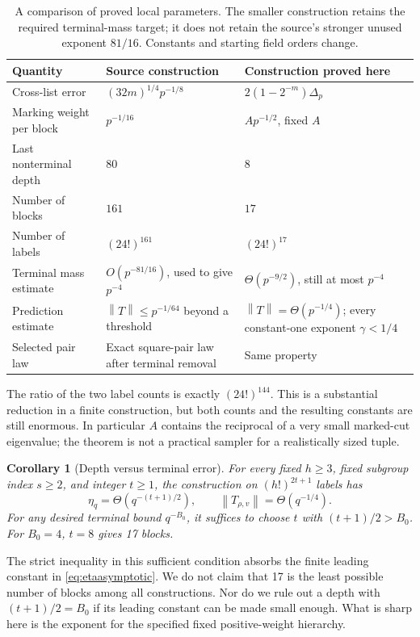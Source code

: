\documentclass[11pt,a4paper]{article}
\numberwithin{equation}{section}
\newtheorem{corollary}[theorem]{Corollary}
\theoremstyle{definition}
\theoremstyle{remark}
\newcommand{\norm}[1]{\left\lVert #1\right\rVert}
\begin{document}
\begin{table}[htbp]
\centering\small
\begin{tabularx}{\textwidth}{@{}lXX@{}}
\toprule
Quantity & Source construction \cite{square} & Construction proved here\\
\midrule
Cross-list error & $(32m)^{1/4}p^{-1/8}$ & $2(1-2^{-m})\Delta_p$\\
Marking weight per block & $p^{-1/16}$ & $A p^{-1/2}$, fixed $A$\\
Last nonterminal depth & $80$ & $8$\\
Number of blocks & $161$ & $17$\\
Number of labels & $(24!)^{161}$ & $(24!)^{17}$\\
Terminal mass estimate & $O(p^{-81/16})$, used to give $p^{-4}$ &
  $\Theta(p^{-9/2})$, still at most $p^{-4}$\\
Prediction estimate & $\norm T\le p^{-1/64}$ beyond a threshold &
  $\norm T=\Theta(p^{-1/4})$; every constant-one exponent $\gamma<1/4$\\
Selected pair law & Exact square-pair law after terminal removal & Same property\\
\bottomrule
\end{tabularx}
\caption{A comparison of proved local parameters. The smaller construction
retains the required terminal-mass target; it does not retain the source's
stronger unused exponent $81/16$. Constants and starting field orders change.}
\label{tab:comparison}
\end{table}

The ratio of the two label counts is exactly $(24!)^{144}$.
This is a substantial reduction in a finite construction, but both
counts and the resulting constants are still enormous. In particular
$A$ contains the reciprocal of a very small marked-cut eigenvalue;
the theorem is not a practical sampler for a realistically sized tuple.

\begin{corollary}[Depth versus terminal error]
\label{cor:tradeoff}
For every fixed $h\ge3$, fixed subgroup index $s\ge2$, and integer
$t\ge1$, the construction on $(h!)^{2t+1}$ labels has
\[
 \eta_q=\Theta(q^{-(t+1)/2}),\qquad
 \norm{T_{\rho,v}}=\Theta(q^{-1/4}).
\]
For any desired terminal bound $q^{-B_0}$, it suffices to choose
$t$ with $(t+1)/2>B_0$. For $B_0=4$, $t=8$ gives 17 blocks.
\end{corollary}

The strict inequality in this sufficient condition absorbs the finite
leading constant in \eqref{eq:etaasymptotic}. We do not claim that
17 is the least possible number of blocks among all constructions.
Nor do we rule out a depth with $(t+1)/2=B_0$ if its leading constant
can be made small enough. What is sharp here is the exponent for the
specified fixed positive-weight hierarchy.
\end{document}
